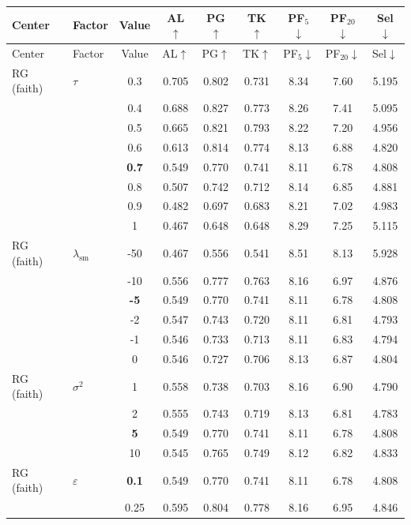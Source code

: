 \begin{longtable}{@{}l l c c c c c c c@{}}
\toprule
Center & Factor & Value & AL$\uparrow$ & PG$\uparrow$ & TK$\uparrow$ & PF$_5$$\downarrow$ & PF$_{20}$$\downarrow$ & Sel$\downarrow$ \\
\midrule
\endfirsthead
\toprule
Center & Factor & Value & AL$\uparrow$ & PG$\uparrow$ & TK$\uparrow$ & PF$_5$$\downarrow$ & PF$_{20}$$\downarrow$ & Sel$\downarrow$ \\
\midrule
\endhead
\bottomrule
\endlastfoot
RG (faith) & $\tau$ & 0.3 & 0.705 & 0.802 & 0.731 & 8.34 & 7.60 & 5.195 \\
 &  & 0.4 & 0.688 & 0.827 & 0.773 & 8.26 & 7.41 & 5.095 \\
 &  & 0.5 & 0.665 & 0.821 & 0.793 & 8.22 & 7.20 & 4.956 \\
 &  & 0.6 & 0.613 & 0.814 & 0.774 & 8.13 & 6.88 & 4.820 \\
 &  & \textbf{0.7} & 0.549 & 0.770 & 0.741 & 8.11 & 6.78 & 4.808 \\
 &  & 0.8 & 0.507 & 0.742 & 0.712 & 8.14 & 6.85 & 4.881 \\
 &  & 0.9 & 0.482 & 0.697 & 0.683 & 8.21 & 7.02 & 4.983 \\
 &  & 1 & 0.467 & 0.648 & 0.648 & 8.29 & 7.25 & 5.115 \\
\midrule
RG (faith) & $\lambda_{\mathrm{sm}}$ & {-}50 & 0.467 & 0.556 & 0.541 & 8.51 & 8.13 & 5.928 \\
 &  & {-}10 & 0.556 & 0.777 & 0.763 & 8.16 & 6.97 & 4.876 \\
 &  & \textbf{{-}5} & 0.549 & 0.770 & 0.741 & 8.11 & 6.78 & 4.808 \\
 &  & {-}2 & 0.547 & 0.743 & 0.720 & 8.11 & 6.81 & 4.793 \\
 &  & {-}1 & 0.546 & 0.733 & 0.713 & 8.11 & 6.83 & 4.794 \\
 &  & 0 & 0.546 & 0.727 & 0.706 & 8.13 & 6.87 & 4.804 \\
\midrule
RG (faith) & $\sigma^2$ & 1 & 0.558 & 0.738 & 0.703 & 8.16 & 6.90 & 4.790 \\
 &  & 2 & 0.555 & 0.743 & 0.719 & 8.13 & 6.81 & 4.783 \\
 &  & \textbf{5} & 0.549 & 0.770 & 0.741 & 8.11 & 6.78 & 4.808 \\
 &  & 10 & 0.545 & 0.765 & 0.749 & 8.12 & 6.82 & 4.833 \\
\midrule
RG (faith) & $\varepsilon$ & \textbf{0.1} & 0.549 & 0.770 & 0.741 & 8.11 & 6.78 & 4.808 \\
 &  & 0.25 & 0.595 & 0.804 & 0.778 & 8.16 & 6.95 & 4.846 \\

\end{longtable}
